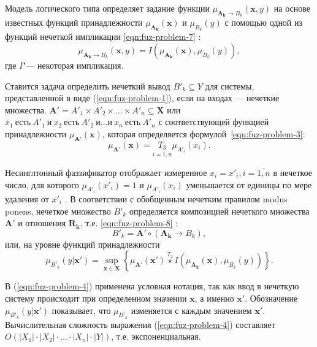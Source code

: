Модель логического типа определяет задание функции $\mu_{\mathbf{A_k} \to B_k} (\mathbf{x}, y)$ на основе известных функций принадлежности $\mu_{\mathbf{A_k}}(\mathbf{x})$ и $\mu_{B_k}(y)$ с помощью одной из функций нечеткой импликации \eqref{eqn:fuz-problem-7} \cite{RyzhovFuzzySets, rutkovskiy2010}:
\begin{equation}
	\label{eqn:fuz-problem-7}
	\mu_{\mathbf{A_k} \to B_k} (\mathbf{x}, y) = I(\mu_{\mathbf{A_k}}(\mathbf{x}), \mu_{B_k}(y)),
\end{equation}
где $I$"--- некоторая импликация.

Ставится задача определить нечеткий вывод $B'_k \subseteq Y$ для системы, представленной в виде (\ref{eqn:fuz-problem-1}), если на входах --- нечеткие множества.
$\mathbf{A'}=A'_1 \times A'_2 \times \dots \times A'_n \subseteq \mathbf{X}$ или $x_1\ \text{есть}\ A'_1\ \text{и}\ x_2\ \text{есть}\ A'_2\ \text{и} \dots \text{и}\ x_n\ \text{есть}\ A'_n$ с соответствующей функцией принадлежности $\mu_{\mathbf{A'}}(\mathbf{x})$, которая определяется формулой~\eqref{eqn:fuz-problem-3}:
\begin{equation}
	\label{eqn:fuz-problem-3}
	\mu_{\mathbf{A'}}(\mathbf{x}) = \underset{i=\overline{1,n}}{T_3} \mu_{A'_i}(x_i).
\end{equation}

Несинглтонный фаззификатор отображает измеренное $x_i=x'_i, i=\overline{1,n}$ в нечеткое число, для которого $\mu_{A'_i}(x'_i) = 1$ и $\mu_{A'_i}(x_i)$ уменьшается от единицы по мере удаления от  $x'_i$ \cite{Mendel2017, Pourabdollah2015}.
В соответствии с обобщенным нечетким правилом modus ponens, нечеткое множество $B'_k$ определяется композицией нечеткого множества $\mathbf{A'}$ и отношения $\mathbf{R_k}$, т.е. \eqref{eqn:fuz-problem-8} \cite{RyzhovFuzzySets, BorisovFuzzySets, rutkovskiy2010}:
\begin{equation}
	\label{eqn:fuz-problem-8}
B'_k = \mathbf{A'} \circ (\mathbf{A_k} \to B_k),
\end{equation}
или, на уровне функций принадлежности
\begin{equation}
	\label{eqn:fuz-problem-4}
	\mu_{B'_k}(y|\mathbf{x'}) = \sup_{\mathbf{x}\in \mathbf{X}}\left\{\mu_{\mathbf{A'}}(\mathbf{x'})\overset{T_2}{\star} I(\mu_{\mathbf{A_k}}(\mathbf{x}), \mu_{B_k}(y))\right\}.
\end{equation}

В (\ref{eqn:fuz-problem-4}) применена условная нотация, так как ввод в нечеткую систему происходит при определенном значении $\mathbf{x}$, а именно $\mathbf{x'}$. Обозначение $\mu_{B'_k}(y | \mathbf{x'})$ показывает, что $\mu_{B'_k}$ изменяется с каждым значением $\mathbf{x'}$. Вычислительная сложность выражения (\ref{eqn:fuz-problem-4}) составляет $O(|X_1|\cdot |X_2|\cdot \dots \cdot |X_n|\cdot |Y|)$, т.е. экспоненциальная. 

